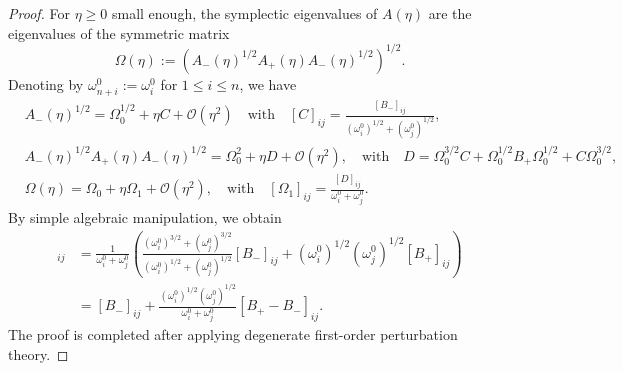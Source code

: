 \documentclass[10pt,a4paper]{amsart}
\begin{document}
\begin{proof}
    For $\eta \ge 0$ small enough, the symplectic eigenvalues of $A(\eta)$ are the eigenvalues of the symmetric matrix
    $$
    \Omega(\eta):=\left( A_-(\eta)^{1/2} A_+(\eta) A_-(\eta)^{1/2} \right)^{1/2}.
    $$
    Denoting by $\omega_{n+i}^0:=\omega_i^0$ for $1 \le i \le n$, we have
    \begin{align*}
    & A_-(\eta)^{1/2} = \Omega_0^{1/2} + \eta C + \mathcal O(\eta^2) \quad \mbox{with} \quad [C]_{ij}=\frac{[B_-]_{ij}}{(\omega_i^0)^{1/2}+(\omega_j^0)^{1/2}}, \\
    & A_-(\eta)^{1/2} A_+(\eta) A_-(\eta)^{1/2} = \Omega_0^2 + \eta D + \mathcal O(\eta^2), \quad \mbox{with} \quad D = \Omega_0^{3/2}C + \Omega_0^{1/2} B_+ \Omega_0^{1/2} + C \Omega_0^{3/2}, \\
    & \Omega(\eta) = \Omega_0 + \eta \Omega_1 + \mathcal O(\eta^2), \quad \mbox{with} \quad [\Omega_1]_{ij} = \frac{[D]_{ij}}{\omega_i^0+\omega_j^0}.
    \end{align*} 
    By simple algebraic manipulation, we obtain
    \begin{align*}
      [\Omega_1]_{ij} &=  \frac{1}{\omega_i^0+\omega_j^0} \left( \frac{(\omega_i^0)^{3/2} + (\omega_j^0)^{3/2}}{(\omega_i^0)^{1/2}+(\omega_j^0)^{1/2}} [B_-]_{ij} + (\omega_i^0)^{1/2} (\omega_j^0)^{1/2} [B_+]_{ij} \right) \\
      & = [B_-]_{ij} +  \frac{(\omega_i^0)^{1/2}(\omega_j^0)^{1/2}}{\omega_i^0+\omega_j^0}  [B_+-B_-]_{ij}.
    \end{align*}
   The proof is completed after applying degenerate first-order perturbation theory.
\end{proof}
\end{document}
